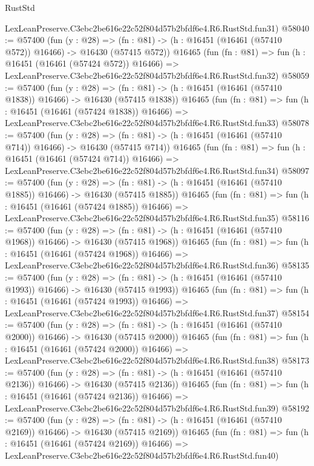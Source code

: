 \begin{lexlean}{RustStd}
\begin{coremodule}
    LexLeanPreserve.C3ebc2be616e22c52f804d57b2bfdf6e4.R6.RustStd.fun31)
@58040 := @57400
    (fun (y : @28) =>
    (fn : @81) -> (h : @16451 (@16461 (@57410 @572)) @16466) -> @16430 (@57415 @572))
    @16465
    (fun (fn : @81) =>
    fun (h : @16451 (@16461 (@57424 @572)) @16466) =>
    LexLeanPreserve.C3ebc2be616e22c52f804d57b2bfdf6e4.R6.RustStd.fun32)
@58059 := @57400
    (fun (y : @28) =>
    (fn : @81) -> (h : @16451 (@16461 (@57410 @1838)) @16466) -> @16430 (@57415 @1838))
    @16465
    (fun (fn : @81) =>
    fun (h : @16451 (@16461 (@57424 @1838)) @16466) =>
    LexLeanPreserve.C3ebc2be616e22c52f804d57b2bfdf6e4.R6.RustStd.fun33)
@58078 := @57400
    (fun (y : @28) =>
    (fn : @81) -> (h : @16451 (@16461 (@57410 @714)) @16466) -> @16430 (@57415 @714))
    @16465
    (fun (fn : @81) =>
    fun (h : @16451 (@16461 (@57424 @714)) @16466) =>
    LexLeanPreserve.C3ebc2be616e22c52f804d57b2bfdf6e4.R6.RustStd.fun34)
@58097 := @57400
    (fun (y : @28) =>
    (fn : @81) -> (h : @16451 (@16461 (@57410 @1885)) @16466) -> @16430 (@57415 @1885))
    @16465
    (fun (fn : @81) =>
    fun (h : @16451 (@16461 (@57424 @1885)) @16466) =>
    LexLeanPreserve.C3ebc2be616e22c52f804d57b2bfdf6e4.R6.RustStd.fun35)
@58116 := @57400
    (fun (y : @28) =>
    (fn : @81) -> (h : @16451 (@16461 (@57410 @1968)) @16466) -> @16430 (@57415 @1968))
    @16465
    (fun (fn : @81) =>
    fun (h : @16451 (@16461 (@57424 @1968)) @16466) =>
    LexLeanPreserve.C3ebc2be616e22c52f804d57b2bfdf6e4.R6.RustStd.fun36)
@58135 := @57400
    (fun (y : @28) =>
    (fn : @81) -> (h : @16451 (@16461 (@57410 @1993)) @16466) -> @16430 (@57415 @1993))
    @16465
    (fun (fn : @81) =>
    fun (h : @16451 (@16461 (@57424 @1993)) @16466) =>
    LexLeanPreserve.C3ebc2be616e22c52f804d57b2bfdf6e4.R6.RustStd.fun37)
@58154 := @57400
    (fun (y : @28) =>
    (fn : @81) -> (h : @16451 (@16461 (@57410 @2000)) @16466) -> @16430 (@57415 @2000))
    @16465
    (fun (fn : @81) =>
    fun (h : @16451 (@16461 (@57424 @2000)) @16466) =>
    LexLeanPreserve.C3ebc2be616e22c52f804d57b2bfdf6e4.R6.RustStd.fun38)
@58173 := @57400
    (fun (y : @28) =>
    (fn : @81) -> (h : @16451 (@16461 (@57410 @2136)) @16466) -> @16430 (@57415 @2136))
    @16465
    (fun (fn : @81) =>
    fun (h : @16451 (@16461 (@57424 @2136)) @16466) =>
    LexLeanPreserve.C3ebc2be616e22c52f804d57b2bfdf6e4.R6.RustStd.fun39)
@58192 := @57400
    (fun (y : @28) =>
    (fn : @81) -> (h : @16451 (@16461 (@57410 @2169)) @16466) -> @16430 (@57415 @2169))
    @16465
    (fun (fn : @81) =>
    fun (h : @16451 (@16461 (@57424 @2169)) @16466) =>
    LexLeanPreserve.C3ebc2be616e22c52f804d57b2bfdf6e4.R6.RustStd.fun40)

\end{coremodule}
\end{lexlean}
